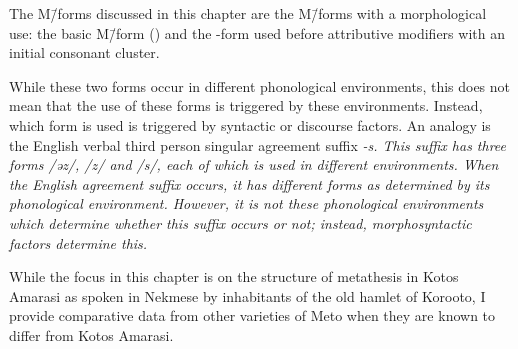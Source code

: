 The M\=/forms discussed in this chapter
are the M\=/forms with a morphological use:
the basic M\=/form ({\M}) and the {\MC}-form
used before attributive modifiers with an initial consonant cluster.

While these two forms occur in
different phonological environments,
this does not mean that the use of these forms
is triggered by these environments.
Instead, which form is used is triggered
by syntactic or discourse factors.
An analogy is the English verbal third person singular agreement suffix \it{-s}.
This suffix has three forms /əz/, /z/ and /s/,
each of which is used in different environments.
When the English  agreement suffix occurs,
it has different forms as determined by its phonological environment.
However, it is not these phonological environments
which determine whether this suffix occurs or not;
instead, morphosyntactic factors determine this.

While the focus in this chapter is on the structure
of metathesis in Kotos Amarasi as spoken in Nekmese{\Q} by
inhabitants of the old hamlet of Koro{\Q}oto, I provide
comparative data from other varieties of Meto when they are
known to differ from Kotos Amarasi.


	
	
	



